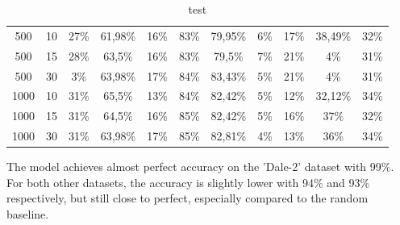 \begin{table}[ht]
\begin{tabular}{cc|ccc|ccc|ccc}
        {500}                           & {10}                      & {27\%}                              & {61,98\%}                           & {16\%}                              & {83\%}            & {79,95\%}                & {6\%}                        & {17\%}            & {38,49\%}                & {32\%}                       \\
        {500}                           & {15}                      & {28\%}                              & {63,5\%}                            & {16\%}                              & {83\%}            & {79,5\%}                 & {7\%}                        & {21\%}            & {4\%}                    & {31\%}                       \\
        {500}                           & {30}                      & {3\%}                               & {63,98\%}                           & {17\%}                              & {84\%}            & {83,43\%}                & {5\%}                        & {21\%}            & {4\%}                    & {31\%}                       \\
        {1000}                          & {10}                      & {31\%}                              & {65,5\%}                            & {13\%}                              & {84\%}            & {82,42\%}                & {5\%}                        & {12\%}            & {32,12\%}                & {34\%}                       \\
        {1000}                          & {15}                      & {31\%}                              & {64,5\%}                            & {16\%}                              & {85\%}            & {82,42\%}                & {5\%}                        & {16\%}            & {37\%}                   & {32\%}                       \\
        {1000}                          & {30}                      & {31\%}                              & {63,98\%}                           & {17\%}                              & {85\%}            & {82,81\%}                & {4\%}                        & {13\%}            & {36\%}                   & {34\%}                       \\
        \bottomrule
    \end{tabular}
    \caption{test}
    \label{test}
\end{table}
The model achieves almost perfect accuracy on the 'Dale-2' dataset with 99\%.
For both other datasets, the accuracy is slightly lower with 94\% and 93\% respectively, but still close to perfect, especially compared to the random baseline.
